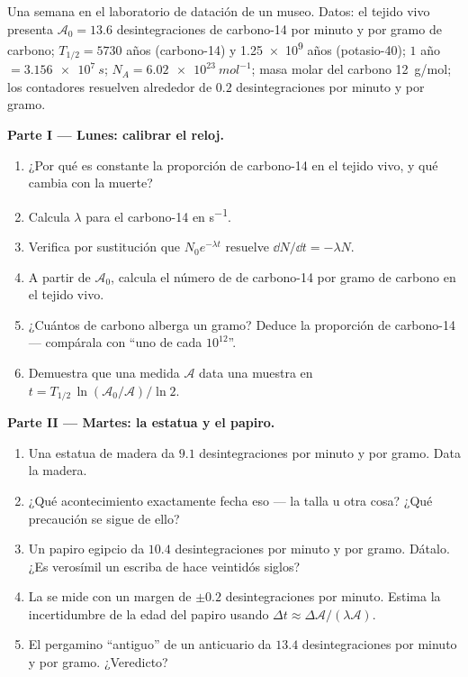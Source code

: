 \begin{problem}
\label{pb:g12:radioactive-decay:1}
Una semana en el laboratorio de datación de un museo. Datos: el tejido vivo presenta
$\mathcal A_0 = 13.6$ desintegraciones de carbono-14 por minuto y por gramo de
carbono; $T_{1/2} = \num{5730}$ años (carbono-14) y \num{1.25e9} años (potasio-40);
$1$ año $= \qty{3.156e7}{s}$; $N_A = \qty{6.02e23}{mol^{-1}}$; masa molar del carbono
\qty{12}{g/mol}; los contadores resuelven alrededor de $0.2$ desintegraciones por
minuto y por gramo.

\medskip
\noindent\textbf{Parte I --- Lunes: calibrar el reloj.}
\begin{enumerate}
  \item ¿Por qué es constante la proporción de carbono-14 en el tejido vivo, y qué
        cambia con la muerte?
  \item Calcula $\lambda$ para el carbono-14 en \unit{s^{-1}}.
  \item Verifica por sustitución que $N_0 e^{-\lambda t}$ resuelve
        $\dd N/\dd t = -\lambda N$.
  \item A partir de $\mathcal A_0$, calcula el número de  de carbono-14 por
        gramo de carbono en el tejido vivo.
  \item ¿Cuántos  de carbono alberga un gramo? Deduce la proporción de
        carbono-14 --- compárala con ``uno de cada $10^{12}$''.
  \item Demuestra que una  medida $\mathcal A$ data una muestra en
        $t = T_{1/2}\,\ln(\mathcal A_0/\mathcal A)/\ln 2$.
\end{enumerate}

\medskip
\noindent\textbf{Parte II --- Martes: la estatua y el papiro.}
\begin{enumerate}[resume]
  \item Una estatua de madera da $9.1$ desintegraciones por minuto y por gramo. Data
        la madera.
  \item ¿Qué acontecimiento exactamente fecha eso --- la talla u otra cosa? ¿Qué
        precaución se sigue de ello?
  \item Un papiro egipcio da $10.4$ desintegraciones por minuto y por gramo. Dátalo.
        ¿Es verosímil un escriba de hace veintidós siglos?
  \item La  se mide con un margen de $\pm 0.2$ desintegraciones por minuto.
        Estima la incertidumbre de la edad del papiro usando
        $\Delta t \approx \Delta\mathcal A/(\lambda \mathcal A)$.
  \item El pergamino ``antiguo'' de un anticuario da $13.4$ desintegraciones por
        minuto y por gramo. ¿Veredicto?
\end{enumerate}


\end{problem}
